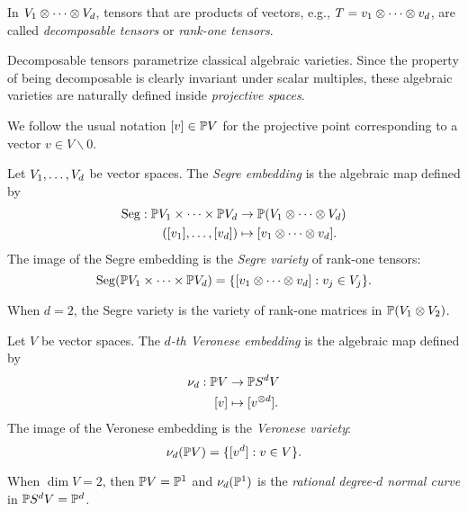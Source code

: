 \begin{definition}\label{introduction-definition-decomposable_tensor}
    In $V_1\otimes \cdots \otimes V_d$, tensors that are products of vectors, e.g., $T = v_1 \otimes \cdots \otimes v_d$, are called \emph{decomposable tensors} or \emph{rank-one tensors}.
\end{definition}
Decomposable tensors parametrize classical algebraic varieties. Since the property of being decomposable is clearly invariant under scalar multiples, these algebraic varieties are naturally defined inside \emph{projective spaces}.

We follow the usual notation $[v] \in \mathbb{P} V$ for the projective point corresponding to a vector $v \in V \smallsetminus 0$.

\begin{definition}
\label{introduction-definition-Segre}

Let $V_1 , \ldots , V_d$ be vector spaces. The \emph{Segre embedding} is the algebraic map defined by 
\begin{align*}
\mathrm{Seg}: \mathbb{P} V_1 \times \cdots \times \mathbb{P} V_d &\to \mathbb{P} (V_1 \otimes \cdots \otimes V_d) \\
([v_1] , \ldots , [v_d]) &\mapsto [v_1 \otimes \cdots \otimes v_d].
\end{align*}
The image of the Segre embedding is the \emph{Segre variety} of rank-one tensors:
\[
\mathrm{Seg}( \mathbb{P} V_1 \times \cdots \times \mathbb{P} V_d) =\{ [v_1 \otimes \cdots \otimes v_d] : v_j \in V_j\}.
\]
\end{definition}
When $d = 2$, the Segre variety is the variety of rank-one matrices in $\mathbb{P} (V_1 \otimes V_2)$.

\begin{definition}
\label{introduction-definition-Veronese}

Let $V$ be vector spaces. The \emph{$d$-th Veronese embedding} is the algebraic map defined by 
\begin{align*}
    \nu_d : \mathbb{P} V &\to \mathbb{P} S^d V \\
    [v] &\mapsto [v^{\otimes d}].
\end{align*}
The image of the Veronese embedding is the \emph{Veronese variety}:
\[
    \nu_d( \mathbb{P} V ) =\{ [v^d] :  v \in V\}.
\]
\end{definition}
When $\dim V = 2$, then $\mathbb{P} V = \mathbb{P}^1$ and $\nu_d( \mathbb{P}^1)$ is the \emph{rational degree-$d$ normal curve} in $\mathbb{P} S^d V = \mathbb{P}^d$.

